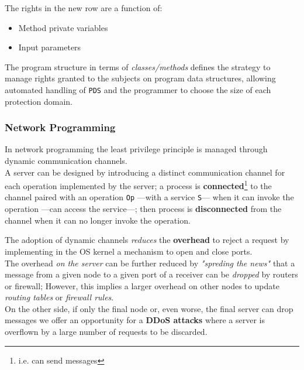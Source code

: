 The rights in the new row are a function of:
\begin{itemize}
   \item Method private variables
   \item Input parameters
\end{itemize}
The program structure in terms of \textit{classes/methods} defines the
strategy to manage rights granted to the subjects on
program data structures,
allowing automated handling of \texttt{PDS} and 
the programmer to choose the size of each protection
domain.

\subsubsection{Network Programming}
In network programming the least privilege principle is
managed through dynamic communication channels.\\
A server can be designed by introducing a distinct communication
channel for each operation implemented by the server; 
a process is \textbf{connected}\footnote{i.e. can send messages} to the channel
paired with an operation \texttt{Op} {---}{with a service \texttt{S}}{---} when it can
invoke the operation {---}{can access the service}{---};
then process is \textbf{disconnected} from the channel when it can no
longer invoke the operation.

The adoption of dynamic channels \textit{reduces} the \textbf{overhead} to reject a request by implementing in the OS kernel a mechanism to open and close ports.\\
The overhead \textit{on the server} can be further reduced by \textit{"spreding the news"}
that a message from a given node to a given port of a receiver
can be \textit{dropped} by routers or firewall;
However, this implies a larger overhead on other nodes to update \textit{routing tables} or \textit{firewall rules}.\\
On the other side, if only the final node or, even worse, the final
server can drop messages we offer an opportunity for a
\textbf{DDoS attacks} where a server is overflown by a large number of
requests to be discarded.

